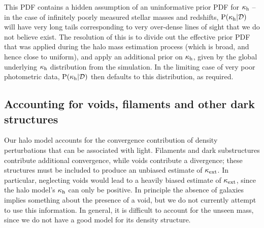 \documentclass[useAMS,usenatbib,a4paper]{mn2e}
\begin{document}
This PDF contains a hidden assumption of an uninformative prior PDF for
$\kappa_{\rm h}$ -- in the case of infinitely poorly measured stellar masses and
redshifts, ${\rm P}(\kappa_{\rm h}|{\mathcal{D}})$ will have very long tails corresponding to
very over-dense lines of sight that we do not believe exist. The resolution of this
is to divide out the effective prior PDF that was applied during the halo mass
estimation process (which is broad, and hence close to uniform), and apply an
additional prior on $\kappa_{\rm h}$, given by the global underlying $\kappa_{\rm h}$
distribution from the simulation. In the limiting  case of very poor
photometric data, ${\rm P}(\kappa_{\rm h}|{\mathcal{D}})$ then defaults to this distribution, as
required.





\subsection{Accounting for voids, filaments and other dark structures}
\label{sec:model:voids}

Our halo model accounts for the convergence contribution of density
perturbations that can be associated with light. Filaments and dark
substructures contribute additional convergence, while voids contribute a
divergence; these structures must be included to produce an unbiased estimate
of $\kappa_{\rm ext}$. In particular, neglecting voids would lead to a heavily biased
estimate of $\kappa_{\rm ext}$, since the halo model's $\kappa_{\rm h}$ can only be positive.
In principle the absence of galaxies implies something about the presence of a
void, but we do not currently attempt to use this information. In general, it
is difficult to account for the unseen mass, since we do not have a good model
for its density structure.
\end{document}
